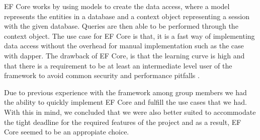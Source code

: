 EF Core works by using models to create the data access, where a model represents the entities in a database and a context object representing a session with the given database. Queries are then able to be performed through the context object. 
The use case for EF Core is that, it is a fast way of implementing data access without the overhead for manual implementation such as the case with dapper. 
The drawback of EF Core, is that the learning curve is high and that there is a requirement to be at least an intermediate level user of the framework to avoid common security and performance pitfalls \cite{EFCore}.

Due to previous experience with the framework among group members we had the ability to quickly implement EF Core and fulfill the use cases that we had. With this in mind, we concluded that we were also better suited to accommodate the tight deadline for the required features of the \knox{} project and as a result, EF Core seemed to be an appropiate choice.
